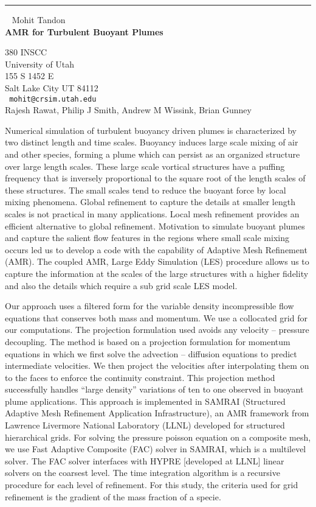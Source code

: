 \documentclass{report}
\begin{document}
\begin{center}

\rule{6in}{1pt} \
{\large
Mohit Tandon
\\ {\bf
AMR for Turbulent Buoyant Plumes
}}

380 INSCC \\
University of Utah \\
155 S 1452 E \\
Salt Lake City UT 84112
\\ {\tt
mohit@crsim.utah.edu
}
\\
Rajesh Rawat,
Philip J Smith,
Andrew M Wissink,
Brian Gunney
\end{center}

Numerical simulation of turbulent buoyancy driven plumes is
characterized by two distinct length and time scales. Buoyancy induces
large scale mixing of air and other species, forming a plume which can
persist as an organized structure over large length scales. These large
scale vortical structures have a puffing frequency that is inversely
proportional to the square root of the length scales of these
structures. The small scales tend to reduce the buoyant force by local
mixing phenomena. Global refinement to capture the details at smaller
length scales is not practical in many applications. Local mesh
refinement provides an efficient alternative to global refinement.
Motivation to simulate buoyant plumes and capture the salient flow
features in the regions where small scale mixing occurs led us to
develop a code with the capability of Adaptive Mesh Refinement (AMR).
The coupled AMR, Large Eddy Simulation (LES) procedure allows us to
capture the information at the scales of the large structures with a
higher fidelity and also the details which require a sub grid scale LES
model.

Our approach uses a filtered form for the variable density
incompressible flow equations that conserves both mass and momentum. We
use a collocated grid for our computations. The projection formulation
used avoids any velocity – pressure decoupling. The method
is based on a projection formulation for momentum equations in which we
first solve the advection – diffusion equations to predict
intermediate velocities. We then project the velocities after
interpolating them on to the faces to enforce the continuity
constraint. This projection method successfully handles
``large density'' variations of ten to one observed
in buoyant plume applications. This approach is implemented in SAMRAI
(Structured Adaptive Mesh Refinement Application Infrastructure), an
AMR framework from Lawrence Livermore National Laboratory (LLNL)
developed for structured hierarchical grids. For solving the pressure
poisson equation on a composite mesh, we use Fast Adaptive Composite
(FAC) solver in SAMRAI, which is a multilevel solver. The FAC solver
interfaces with HYPRE [developed at LLNL] linear solvers on the
coarsest level. The time integration algorithm is a recursive procedure
for each level of refinement. For this study, the criteria used for
grid refinement is the gradient of the mass fraction of a specie.
\end{document}
